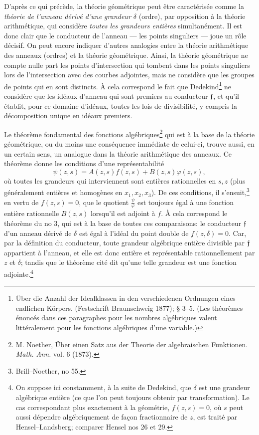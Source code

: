 D'après ce qui précède, la théorie géométrique peut être caractérisée comme la \emph{théorie de l'anneau dérivé d'une grandeur \(\delta\)} (ordre), par opposition à la théorie arithmétique, qui considère \emph{toutes les grandeurs entières} simultanément. Il est donc clair que le conducteur de l'anneau --- les points singuliers --- joue un rôle décisif. On peut encore indiquer d'autres analogies entre la théorie arithmétique des anneaux (ordres) et la théorie géométrique. Ainsi, la théorie géométrique ne compte nulle part les points d'intersection qui tombent dans les points singuliers lors de l'intersection avec des courbes adjointes, mais ne considère que les groupes de points qui en sont distincts. À cela correspond le fait que Dedekind\footnote{Über die Anzahl der Idealklassen in den verschiedenen Ordnungen eines endlichen Körpers. (Festschrift Braunschweig 1877); \S{} 3--5. (Les théorèmes énoncés dans ces paragraphes pour les nombres algébriques valent littéralement pour les fonctions algébriques d'une variable.)} ne considère que les idéaux d'anneau qui sont premiers au conducteur \(\mathfrak f\), et qu'il établit, pour ce domaine d'idéaux, toutes les lois de divisibilité, y compris la décomposition unique en idéaux premiers.

Le \og{}théorème fondamental des fonctions algébriques\fg{}\footnote{M. Noether, Über einen Satz aus der Theorie der algebraischen Funktionen. \emph{Math. Ann.} vol. 6 (1873).} qui est à la base de la théorie géométrique, ou du moins une conséquence immédiate de celui-ci, trouve aussi, en un certain sens, un analogue dans la théorie arithmétique des anneaux. Ce théorème donne les conditions d'une représentabilité
\[
\psi(z,s)=A(z,s)f(z,s)+B(z,s)\varphi(z,s),
\]
où toutes les grandeurs qui interviennent sont entières rationnelles en \(s,z\) (plus généralement entières et homogènes en \(x_1,x_2,x_3\)). De ces conditions, il s'ensuit,\footnote{Brill--Noether, no 55.} en vertu de \(f(z,s)=0\), que le quotient \(\frac{\psi}{\varphi}\) est toujours égal à une fonction entière rationnelle \(B(z,s)\) lorsqu'il est adjoint à \(f\). À cela correspond le théorème du no 3, qui est à la base de toutes ces comparaisons: le conducteur \(\mathfrak f\) d'un anneau dérivé de \(\delta\) est égal à l'idéal du point double de \(f(z,\delta)=0\). Car, par la définition du conducteur, toute grandeur algébrique entière divisible par \(\mathfrak f\) appartient à l'anneau, et elle est donc entière et représentable rationnellement par \(z\) et \(\delta\); tandis que le théorème cité dit qu'une telle grandeur est une fonction adjointe.\footnote{On suppose ici constamment, à la suite de Dedekind, que \(\delta\) est une grandeur algébrique entière (ce que l'on peut toujours obtenir par transformation). Le cas correspondant plus exactement à la géométrie, \(f(z,s)=0\), où \(s\) peut aussi dépendre algébriquement de façon fractionnaire de \(z\), est traité par Hensel--Landsberg; comparer Hensel nos 26 et 29.}
